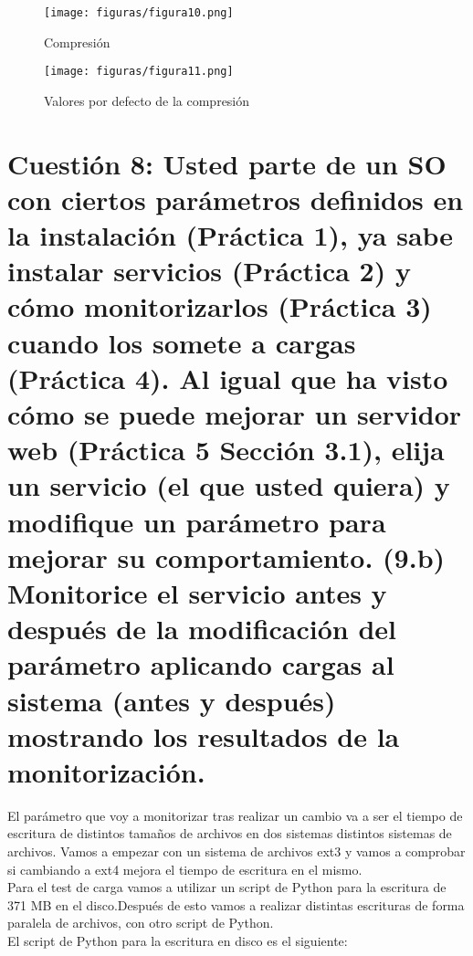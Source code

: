\begin{figure}[H] %
	\centering
	\texttt{[image: figuras/figura10.png]}  %
	
	
	\caption{Compresión}
	\label{figura10}
\end{figure}

\begin{figure}[H] %
	\centering
	\texttt{[image: figuras/figura11.png]}  %
	
	
	\caption{Valores por defecto de la compresión}
	\label{figura11}
\end{figure}


\section{Cuestión 8: Usted parte de un SO con ciertos parámetros definidos en la instalación (Práctica 1), ya sabe instalar servicios (Práctica 2) y cómo monitorizarlos (Práctica 3) cuando los somete a cargas (Práctica 4). Al igual que ha visto cómo se puede mejorar un servidor web (Práctica 5 Sección 3.1), elija un servicio (el que usted quiera) y modifique un parámetro para mejorar su comportamiento. (9.b) Monitorice el servicio antes y después de la modificación del parámetro aplicando cargas al sistema (antes y después) mostrando los resultados de la monitorización.}

El parámetro que voy a monitorizar tras realizar un cambio va a ser el tiempo de escritura de distintos tamaños de archivos en dos sistemas distintos sistemas de archivos. Vamos a empezar con un sistema de archivos ext3 y vamos a comprobar si cambiando a ext4 mejora el tiempo de escritura en el mismo.\\
Para el test de carga vamos a utilizar un  script de Python para la escritura de 371 MB en el disco.Después de esto vamos a realizar distintas escrituras de forma paralela de archivos, con otro script de Python.\\

El script de Python para la escritura en disco es el siguiente:

